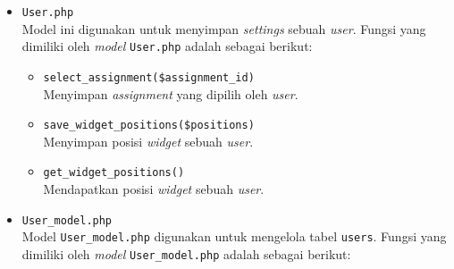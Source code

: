 \documentclass[a4paper,twoside]{article}
\begin{document}
\begin{enumerate}
\begin{itemize}
\begin{itemize}
			                  \vspace{0.5cm}
			            \item \verb|User.php| \\
			                  Model ini digunakan untuk menyimpan \textit{settings} sebuah \textit{user}. Fungsi yang dimiliki oleh \textit{model} \verb|User.php| adalah sebagai berikut:

			                  \begin{itemize}
				                  \item \verb|select_assignment($assignment_id)| \\
				                        Menyimpan \textit{assignment} yang dipilih oleh \textit{user}.
				                  \item \verb|save_widget_positions($positions)| \\
				                        Menyimpan posisi \textit{widget} sebuah \textit{user}.
				                  \item \verb|get_widget_positions()| \\
				                        Mendapatkan posisi \textit{widget} sebuah \textit{user}.
			                  \end{itemize}

			                  \vspace{0.5cm}
			            \item \verb|User_model.php| \\
			                  Model \verb|User_model.php| digunakan untuk mengelola tabel \verb|users|. Fungsi yang dimiliki oleh \textit{model} \verb|User_model.php| adalah sebagai berikut:


\end{itemize}
\end{itemize}
\end{enumerate}
\end{document}
